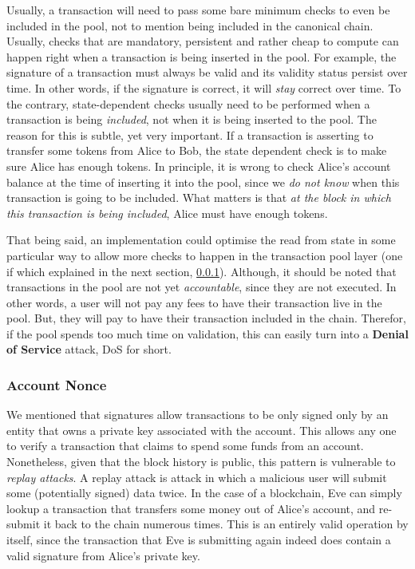 Usually, a transaction will need to pass some bare minimum checks to even be included in the pool,
not to mention being included in the canonical chain. Usually, checks that are mandatory, persistent
and rather cheap to compute can happen right when a transaction is being inserted in the pool. For
example, the signature of a transaction must always be valid and its validity status persist over
time. In other words, if the signature is correct, it will \textit{stay} correct over time. To the
contrary, state-dependent checks usually need to be performed when a transaction is being
\textit{included}, not when it is being inserted to the pool. The reason for this is subtle, yet
very important. If a transaction is asserting to transfer some tokens from Alice to Bob, the state
dependent check is to make sure Alice has enough tokens. In principle, it is wrong to check Alice's
account balance at the time of inserting it into the pool, since we \textit{do not know} when this
transaction is going to be included. What matters is that \textit{at the block in which this
transaction is being included}, Alice must have enough tokens.

That being said, an implementation could optimise the read from state in some particular way to
allow more checks to happen in the transaction pool layer (one if which explained in the next
section, \ref{chap_bg:subsec:nonce}). Although, it should be noted that transactions in the pool are
not yet \textit{accountable}, since they are not executed. In other words, a user will not pay any
fees to have their transaction live in the pool. But, they will pay to have their transaction
included in the chain. Therefor, if the pool spends too much time on validation, this can easily
turn into a \textbf{Denial of Service} attack, DoS for short.

\subsubsection{Account Nonce} \label{chap_bg:subsec:nonce}

We mentioned that signatures allow transactions to be only signed only by an entity that owns a
private key associated with the account. This allows any one to verify a transaction that claims to
spend some funds from an account. Nonetheless, given that the block history is public, this pattern
is vulnerable to \textit{replay attacks}. A replay attack is attack in which a malicious user will
submit some (potentially signed) data twice. In the case of a blockchain, Eve can simply lookup a
transaction that transfers some money out of Alice's account, and re-submit it back to the chain
numerous times. This is an entirely valid operation by itself, since the transaction that Eve is
submitting again indeed does contain a valid signature from Alice's private key.

